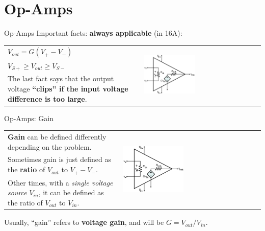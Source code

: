 \section{Op-Amps}

\begin{frame}{Op-Amps}
    Important facts: \textbf{always applicable} (in 16A): \\[10pt]
    \begin{tabular}{m{} m{}}
        $V_{out} = G(V_+ - V_-)$ & 
        \multirow{3}{*}{
            \includegraphics[width=0.45\textwidth]{images/opamp_model.png}
        } \\[5pt]
        $V_{S+} \geq V_{out} \geq V_{S-}$ & \\[10pt]
        The last fact says that the output voltage \textbf{“clips” if the input voltage difference is too large}.
    \end{tabular}
\end{frame}

\begin{frame}{Op-Amps: Gain}
    \begin{tabular}{m{} m{}}
        \textbf{Gain} can be defined differently depending on the problem. & 
        \multirow{3}{*}{
            \includegraphics[width=0.45\textwidth]{images/opamp_model.png}
        } \\[20pt]
        Sometimes gain is just defined as the \textbf{ratio} of $V_{out}$ to $V_+ - V_-$. & \\[20pt]
        Other times, with a \textit{single voltage source} $V_{in}$, it can be defined as the ratio of $V_{out}$ to $V_{in}$. & \\[25pt]
    \end{tabular}
    Usually, “gain” refers to \textbf{voltage gain}, and will be $G = V_{out}/V_{in}$.
\end{frame}

